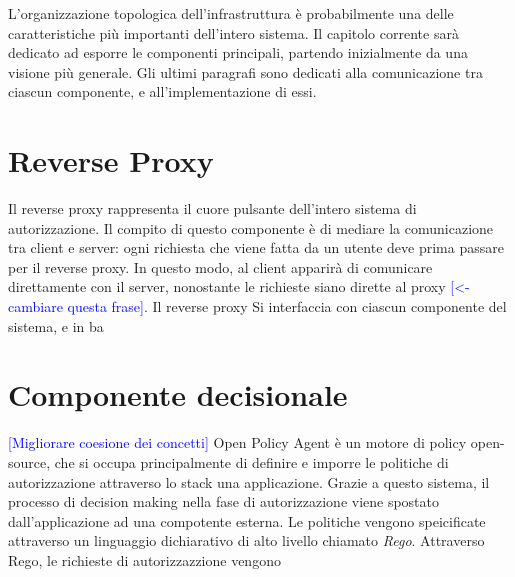 L'organizzazione topologica dell'infrastruttura è probabilmente una delle caratteristiche più importanti dell'intero sistema. 
Il capitolo corrente sarà dedicato ad esporre le componenti principali, 
partendo inizialmente da una visione più generale. Gli ultimi paragrafi sono dedicati alla comunicazione tra ciascun componente, e all'implementazione di essi. 

\section{Reverse Proxy}
Il reverse proxy rappresenta il cuore pulsante dell'intero sistema di autorizzazione. Il compito di questo componente è di
 mediare la comunicazione tra client e server: ogni richiesta che viene fatta da un utente deve prima passare per il reverse proxy. 
 In questo modo, al client apparirà di comunicare direttamente con il server, nonostante le richieste siano dirette al proxy \textcolor{blue}{[<- cambiare questa frase]}. 
 Il reverse proxy   Si interfaccia con ciascun componente del sistema, e in ba  

\section{Componente decisionale}
\textcolor{blue}{[Migliorare coesione dei concetti]}
Open Policy Agent è un motore di policy open-source, che si occupa principalmente di definire e imporre le politiche di autorizzazione attraverso lo stack una applicazione.
Grazie a questo sistema, il processo di decision making nella fase di autorizzazione viene spostato dall'applicazione ad una compotente esterna. 
\newline
Le politiche vengono speicificate attraverso un linguaggio dichiarativo di alto livello chiamato \textit{Rego}.
Attraverso Rego, le richieste di autorizzazzione vengono 